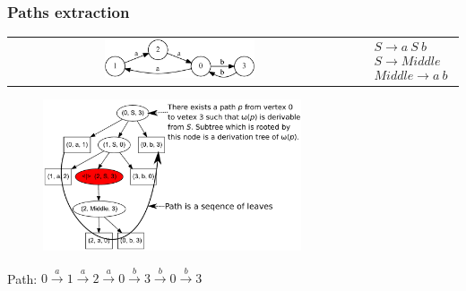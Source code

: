\documentclass[xcolor=table]{beamer}
\begin{document}
\begin{frame}[fragile] \frametitle{Paths extraction}
\begin{center}
\begin{tabular}{  c  c  }
    \includegraphics[width=0.45\textwidth]{pictures/input.pdf}
    &
$

\begin{array}{rl}
   & S \rightarrow a \ S \ b \\
   & S \rightarrow Middle \\
   & Middle \rightarrow a \ b
\end{array}

$
\end{tabular}

\begin{figure}[ht]
    \centering
        \includegraphics[width=0.68\textwidth]{pictures/AnBn_2_m.pdf}
\end{figure}
Path: $0\xrightarrow{a}1\xrightarrow{a}2\xrightarrow{a}0\xrightarrow{b}3\xrightarrow{b}0\xrightarrow{b}3$
\end{center}
\end{frame}
\end{document}
